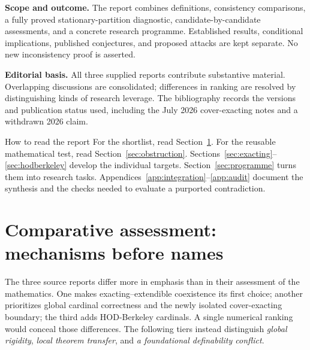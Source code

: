 \documentclass[11pt,letterpaper]{article}
\theoremstyle{definition}
\begin{document}
\textbf{Scope and outcome.} The report combines definitions, consistency comparisons, a fully proved stationary-partition diagnostic, candidate-by-candidate assessments, and a concrete research programme. Established results, conditional implications, published conjectures, and proposed attacks are kept separate. No new inconsistency proof is asserted.

\textbf{Editorial basis.} All three supplied reports contribute substantive material. Overlapping discussions are consolidated; differences in ranking are resolved by distinguishing kinds of research leverage. The bibliography records the versions and publication status used, including the July 2026 cover-exacting notes and a withdrawn 2026 claim.

\clearpage
\tableofcontents
\vspace{10pt}
\begin{assessment}{How to read the report}
For the shortlist, read Section~\ref{sec:shortlist}. For the reusable mathematical test, read Section~\ref{sec:obstruction}. Sections~\ref{sec:exacting}--\ref{sec:hodberkeley} develop the individual targets. Section~\ref{sec:programme} turns them into research tasks. Appendices~\ref{app:integration}--\ref{app:audit} document the synthesis and the checks needed to evaluate a purported contradiction.
\end{assessment}

\clearpage
\section{Comparative assessment: mechanisms before names}\label{sec:shortlist}

The three source reports differ more in emphasis than in their assessment of the mathematics. One makes exacting--extendible coexistence its first choice; another prioritizes global cardinal correctness and the newly isolated cover-exacting boundary; the third adds HOD-Berkeley cardinals. A single numerical ranking would conceal those differences. The following tiers instead distinguish \emph{global rigidity}, \emph{local theorem transfer}, and \emph{a foundational definability conflict}.
\end{document}
